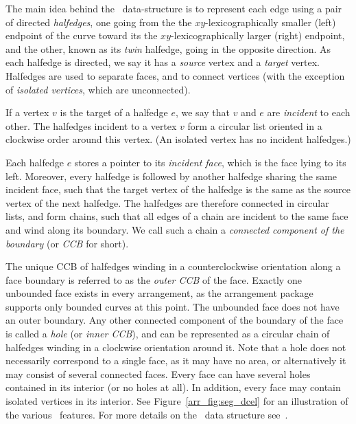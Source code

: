 The main idea behind the \dcel\ data-structure is to represent
each edge using a pair of directed {\em halfedges}, one going from
the the $xy$-lexicographically smaller (left) endpoint of the curve toward
its the $xy$-lexicographically larger (right) endpoint, and the other,
known as its {\em twin} halfedge, going in the opposite direction. As each
halfedge is directed, we say it has a {\em source} vertex and a {\em target}
vertex. Halfedges are used to separate faces, and to
connect vertices (with the exception of {\em isolated vertices}, which
are unconnected).

If a vertex $v$ is the target of a halfedge $e$, we say that $v$
and $e$ are {\em incident} to each other. The halfedges incident
to a vertex $v$ form a circular list oriented in a clockwise order
around this vertex. (An isolated vertex has no incident halfedges.)

Each halfedge $e$ stores a pointer to its {\it incident face},
which is the face lying to its left. Moreover, every halfedge is
followed by another halfedge sharing the same incident face, such
that the target vertex of the halfedge is the same as the source
vertex of the next halfedge. The halfedges are therefore connected
in circular lists, and form chains, such that all edges of a chain
are incident to the same face and wind along its boundary. We call
such a chain a {\em connected component of the boundary} (or {\em
CCB} for short).

The unique CCB of halfedges winding in a counterclockwise orientation
along a face boundary is referred to as the {\em outer CCB} of the
face. Exactly one unbounded face exists in every arrangement, as the
arrangement package supports only bounded curves at this point. The
unbounded face does not have an outer boundary. Any other connected
component of the boundary of the face is called a {\em hole} (or {\em
inner CCB}), and can be represented as a circular chain of halfedges
winding in a clockwise orientation around it. Note that a hole does not
necessarily correspond to a single face, as it may have no area,
or alternatively it may consist of several connected faces.  Every
face can have several holes contained in its interior (or no holes at
all). In addition, every face may contain isolated vertices in its
interior. See Figure~\ref{arr_fig:seg_dcel} for an illustration of the
various \dcel\ features. For more details on the \dcel\ data structure
see~\cite[Chapter~2]{bkos-cgaa-00}.

